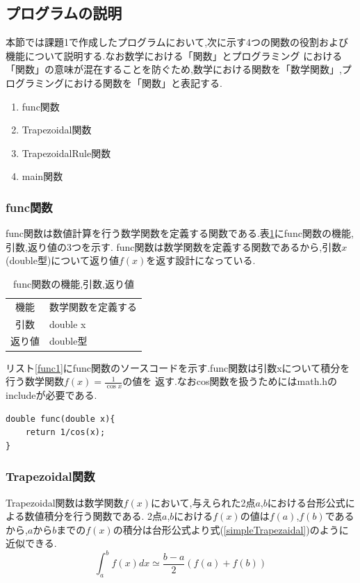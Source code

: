 \documentclass[dvipdfmx]{jarticle}
\begin{document}
    \subsection{プログラムの説明}
    本節では課題1で作成したプログラムにおいて,次に示す4つの関数の役割および機能について説明する.なお数学における「関数」とプログラミング
    における「関数」の意味が混在することを防ぐため,数学における関数を「数学関数」,プログラミングにおける関数を「関数」と表記する.
    \begin{enumerate}
      \item func関数
      \item Trapezoidal関数
      \item TrapezoidalRule関数
      \item main関数
      \end{enumerate}
    
    \subsubsection{func関数}
    func関数は数値計算を行う数学関数を定義する関数である.表\ref{func1table}にfunc関数の機能,引数,返り値の3つを示す.
    func関数は数学関数を定義する関数であるから,引数$x$(double型)について返り値$f(x)$を返す設計になっている.
      \begin{table}[H]
      \caption{func関数の機能,引数,返り値}
      \label{func1table}
      \begin{center}
          \begin{tabular}{c|l}\hline
        機能 & 数学関数を定義する\\
        引数 & double x \\
        返り値 & double型 \\ \hline
          \end{tabular}
      \end{center}
      \end{table}

    リスト\ref{func1}にfunc関数のソースコードを示す.func関数は引数xについて積分を行う数学関数$f(x) = \frac{1}{\cos x}$の値を
    返す.なおcos関数を扱うためにはmath.hのincludeが必要である.
    \begin{lstlisting}[basicstyle=\ttfamily\footnotesize, frame=single,label=func1,caption=func関数]
double func(double x){
    return 1/cos(x);
} 
    \end{lstlisting}

    \subsubsection{Trapezoidal関数}
    Trapezoidal関数は数学関数$f(x)$において,与えられた2点$a$,$b$における台形公式による数値積分を行う関数である.
    2点$a$,$b$における$f(x)$の値は$f(a)$,$f(b)$であるから,$a$から$b$までの$f(x)$の積分は台形公式より式(\ref{simpleTrapezaidal})のように
    近似できる.
    \begin{equation}
      \int_a^b f(x) dx \simeq \frac{b-a}{2}(f(a)+f(b))
          \label{simpleTrapezaidal}
        \end{equation}
\end{document}

